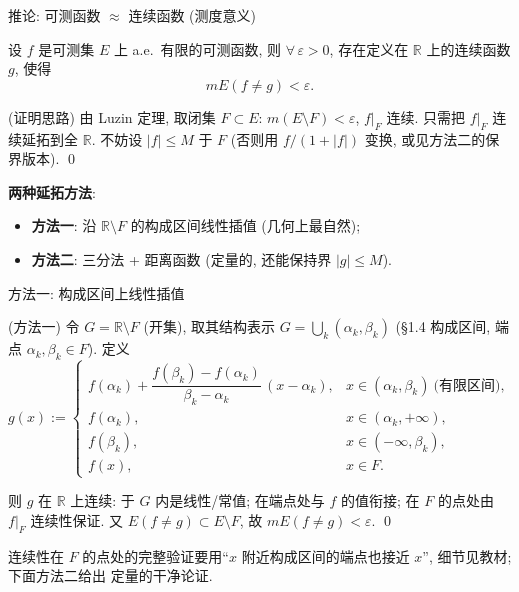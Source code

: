 
\begin{frame}{推论: 可测函数 $\approx$ 连续函数 (测度意义)}

\begin{cor}[延拓定理]
设 $f$ 是可测集 $E$ 上 a.e.\ 有限的可测函数, 则 $\forall\, \varepsilon > 0$, 存在定义在
$\mathbb{R}$ 上的\alert{连续函数} $g$, 使得
\[
mE(f \neq g) < \varepsilon .
\]
\end{cor}

\pause

\startproof[bg=yellow, fg=red](证明思路)
由 Luzin 定理, 取闭集 $F \subset E$: $m(E \setminus F) < \varepsilon$, $f\big|_F$ 连续.
\alert{只需把 $f\big|_F$ 连续延拓到全 $\mathbb{R}$}. 不妨设 $|f| \leqslant M$ 于 $F$
(否则用 $f/(1+|f|)$ 变换, 或见方法二的保界版本).
\qed

\pause

\textbf{两种延拓方法}:
\begin{itemize}
\item \textbf{方法一}: 沿 $\mathbb{R} \setminus F$ 的构成区间\alert{线性插值} (几何上最自然);
\item \textbf{方法二}: 三分法 + \alert{距离函数} (定量的, 还能保持界 $|g| \leqslant M$).
\end{itemize}

\end{frame}


\begin{frame}{方法一: 构成区间上线性插值}

\startproof[bg=yellow, fg=red](方法一)
令 $G = \mathbb{R} \setminus F$ (开集), 取其结构表示
$G = \bigcup_k (\alpha_k, \beta_k)$ (\S 1.4 构成区间, 端点 $\alpha_k, \beta_k \in F$). 定义
\[
g(x) := \begin{cases}
f(\alpha_k) + \dfrac{f(\beta_k) - f(\alpha_k)}{\beta_k - \alpha_k}\,(x - \alpha_k),
  & x \in (\alpha_k, \beta_k)\ \text{(有限区间)}, \\[0.6em]
f(\alpha_k), & x \in (\alpha_k, +\infty), \\[0.3em]
f(\beta_k), & x \in (-\infty, \beta_k), \\[0.3em]
f(x), & x \in F .
\end{cases}
\]

\pause

则 $g$ 在 $\mathbb{R}$ 上连续: 于 $G$ 内是线性/常值; 在端点处与 $f$ 的值衔接; 在 $F$ 的点处由
$f\big|_F$ 连续性保证. 又 $E(f \neq g) \subset E \setminus F$, 故 $mE(f \neq g) < \varepsilon$.
\qed

\begin{remark}
连续性在 $F$ 的点处的完整验证要用``$x$ 附近构成区间的端点也接近 $x$'', 细节见教材; 下面方法二给出
\alert{定量}的干净论证.
\end{remark}

\end{frame}

